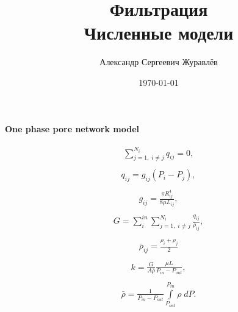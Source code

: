 \documentclass[a4paper,12pt,russian]{extreport}
\author{Александр Сергеевич Журавлёв}
\title{Фильтрация\\Численные модели}
\date{\today}
\begin{document}
\pagecolor{pageColor}
\color{fontColor}
\Russian
\printnomenclature[5em]


\begin{center}
{\large \textbf{One phase pore network model}}
\end{center}

\begin{eqnarray}
\begin{gathered}
\sum^{N_{i}}_{j=1, \; i\neq j} q_{ij} = 0,  
\end{gathered}
\end{eqnarray}
%
\begin{eqnarray}
\begin{gathered}
q_{ij} = g_{ij} (P_{i} - P_{j}),  
\end{gathered}
\end{eqnarray}
%
\begin{eqnarray}
\begin{gathered}
 g_{ij} =\frac{\pi R_{ij}^{4}}{8 \mu L_{ij}}, 
\end{gathered}
\end{eqnarray}
%
\begin{eqnarray}
\begin{gathered}
G = \sum_{i}^{in} \sum^{N_{i}}_{j=1, \; i\neq j} \frac{q_{ij}}{\bar{\rho}_{ij}},
\end{gathered}
\end{eqnarray}
%
\begin{eqnarray}
\begin{gathered}
\bar{\rho}_{ij} = \frac{\rho_{i}+\rho_{j}}{2}
\end{gathered}
\end{eqnarray}
%
\begin{eqnarray}
\begin{gathered}
k = \frac{G}{A \bar{\rho}} \frac{\mu L}{P_{in} - P_{out}},
\end{gathered}
\end{eqnarray}
%
\begin{eqnarray}
\begin{gathered}
 \bar{\rho}=\frac{1}{P_{in}-P_{out}} \int\limits^{P_{in}}_{P_{out}}\rho \; dP.
\end{gathered}
\end{eqnarray}
\end{document}
